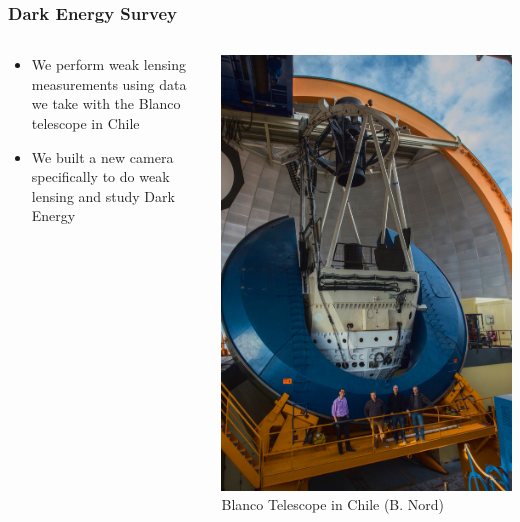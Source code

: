 \documentclass{beamer}
\begin{document}
\frame
{

    \frametitle{Dark Energy Survey}


    \begin{columns}
        \begin{column}{0.5\textwidth}
            \begin{itemize}

                \item We perform weak lensing measurements using data we take
                    with the Blanco telescope in Chile

                \item We built a new camera specifically to do weak lensing and
                    study Dark Energy

            \end{itemize}

        \end{column}
        \begin{column}{0.5\textwidth}
            \begin{center}
                \includegraphics[height=0.7\textheight]{ctio_blanco_crew_2013Oct-30-small-balance.jpg}
                \newline
                {\tiny Blanco Telescope in Chile (B. Nord)}
            \end{center}
        \end{column}


\end{columns}}
\end{document}
